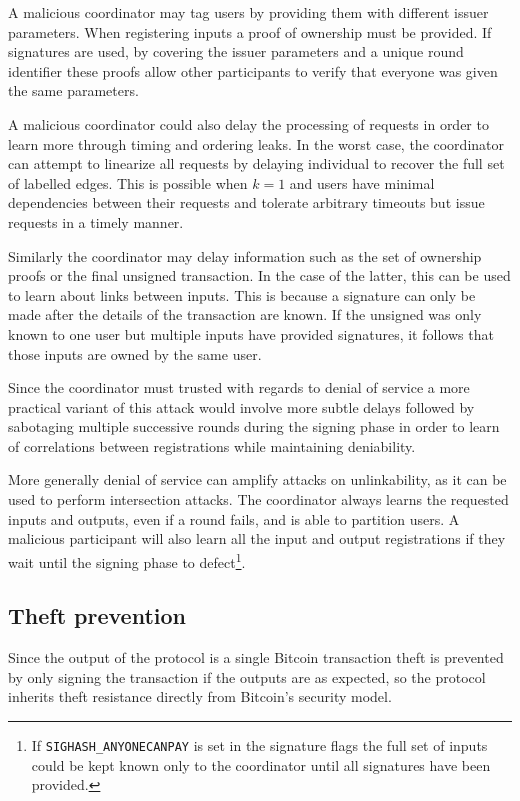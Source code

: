 \documentclass[a4paper]{article}
\begin{document}
A malicious coordinator may tag users by providing them with different issuer parameters. When registering inputs a proof of ownership must be provided. If signatures are used, by covering the issuer parameters and a unique round identifier these proofs allow other participants to verify that everyone was given the same parameters.

A malicious coordinator could also delay the processing of requests in order to learn more through timing and ordering leaks. In the worst case, the coordinator can attempt to linearize all requests by delaying individual to recover the full set of labelled edges. This is possible when $k=1$ and users have minimal dependencies between their requests and tolerate arbitrary timeouts but issue requests in a timely manner.

Similarly the coordinator may delay information such as the set of ownership proofs or the final unsigned transaction. In the case of the latter, this can be used to learn about links between inputs. This is because a signature can only be made after the details of the transaction are known. If the unsigned was only known to one user but multiple inputs have provided signatures, it follows that those inputs are owned by the same user.

Since the coordinator must trusted with regards to denial of service a more practical variant of this attack would involve more subtle delays followed by sabotaging multiple successive rounds during the signing phase in order to learn of correlations between registrations while maintaining deniability.

More generally denial of service can amplify attacks on unlinkability, as it can be used to perform intersection attacks. The coordinator always learns the requested inputs and outputs, even if a round fails, and is able to partition users. A malicious participant will also learn all the input and output registrations if they wait until the signing phase to defect\footnote{If \texttt{SIGHASH\_ANYONECANPAY} is set in the signature flags the full set of inputs could be kept known only to the coordinator until all signatures have been provided.}.

\subsection{Theft prevention}

Since the output of the protocol is a single Bitcoin transaction theft is prevented by only signing the transaction if the outputs are as expected, so the protocol inherits theft resistance directly from Bitcoin's security model.
\end{document}
